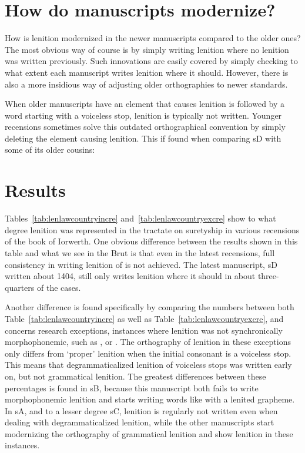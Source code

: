 \section{How do manuscripts modernize?}
\label{sec:how-do-manuscripts}

How is lenition modernized in the newer manuscripts compared to the older ones?
The most obvious way of course is by simply writing lenition where no lenition was written previously. Such innovations are easily covered by simply checking to what extent each manuscript writes lenition where it should. However, there is also a more insidious way of adjusting older orthographies to newer standards.

When older manuscripts have an element that causes lenition is followed by a word starting with a voiceless stop, lenition is typically not written. Younger recensions sometimes solve this outdated orthographical convention by simply deleting the element causing lenition. This if found when comparing \gls{sD} with some of its older cousins:
\begin{mwl}
\end{mwl}

\section{Results}
\label{sec:results}

Tables~\ref{tab:lenlawcountryincre} and~\ref{tab:lenlawcountryexcre} show to what degree lenition was represented in the tractate on suretyship in various recensions of the book of Iorwerth. One obvious difference between the results shown in this table and what we see in the Brut  is that even in the latest recensions, full consistency in writing  lenition of  is not achieved. The latest manuscript, \gls{sD} written about 1404, still only writes lenition where it should in about three-quarters of the cases.

Another difference is found specifically by comparing the numbers between both Table~\ref{tab:lenlawcountryincre} as well as Table~\ref{tab:lenlawcountryexcre}, and concerns research exceptions, \ie instances where lenition was not synchronically morphophonemic, such as , or . The orthography of lenition in these exceptions only differs from `proper' lenition when the initial consonant is a voiceless stop. This means that degrammaticalized lenition of voiceless stops was written early on, but not grammatical lenition. The greatest differences between these percentages is found in \gls{sB}, because this manuscript both fails to write morphophonemic lenition and starts writing words like  with a lenited grapheme. In \gls{sA}, and to a lesser degree \gls{sC}, lenition is regularly not written even when dealing with degrammaticalized lenition, while the other manuscripts start modernizing the orthography of grammatical lenition and show lenition in these instances.

